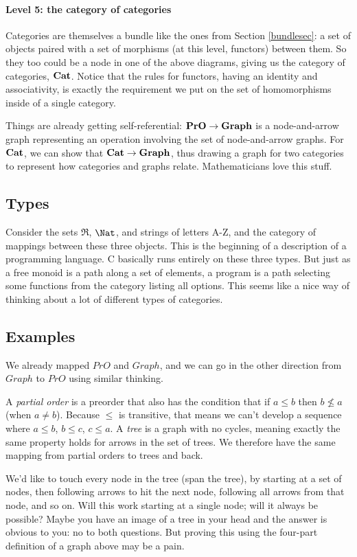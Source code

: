 \documentclass[11pt]{article}
\begin{document}
\paragraph{Level 5: the category of categories}
Categories are themselves a bundle like the ones from Section \ref{bundlesec}: a set
of objects paired with a set of morphisms (at this level, functors) between them. So
they too could be a node in one of the above diagrams, giving us the category of
categories, ${\bf Cat}$. Notice that the rules for functors, having an identity and
associativity, is exactly the requirement we put on the set of homomorphisms inside
of a single category.

Things are already getting self-referential: ${\bf PrO}\to {\bf Graph}$ is a
node-and-arrow graph representing an operation involving the set of node-and-arrow
graphs. For ${\bf Cat}$, we can show that ${\bf Cat}\to {\bf Graph}$, thus drawing a
graph for two categories to represent how categories and graphs relate.  Mathematicians
love this stuff.

\subsection{Types} Consider the sets $\Re$, $\Nat$, and strings of letters A-Z, and the
category of mappings between these three objects. This is the beginning of a description
of a programming language. C basically runs entirely on these three types. But just as a
free monoid is a path along a set of elements, a program is a path selecting some
functions from the category listing all options. This seems like a nice way of thinking
about a lot of different types of categories.


\subsection{Examples} We already mapped $PrO$ and $Graph$, and we can go in the other
direction from $Graph$ to $PrO$ using similar thinking.

A {\em partial order} is a preorder that also has the condition that if $a\leq b$ then
$b\not\leq a$ (when $a\neq b$). Because $\leq$ is transitive, that means we can't
develop a sequence where $a\leq b$, $b\leq c$, $c\leq a$.
A {\em tree} is a graph with no cycles, meaning exactly the same property holds for arrows
in the set of trees. We therefore have the same mapping from partial orders to trees and
back.

We'd like to touch every node in the tree (span the tree), by starting at a set of
nodes, then following arrows to hit the next node, following all arrows from that node, and so on.
Will this work starting at a single node; will it always be possible? Maybe you have an
image of a tree in your head and the answer is obvious to you: no to both questions.
But proving this using the four-part definition of a graph above may be a pain.
\end{document}
